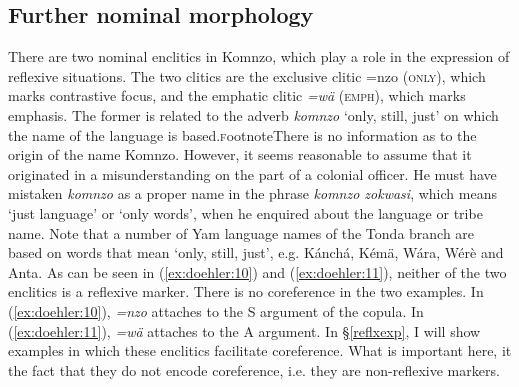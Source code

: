 \documentclass[output=paper]{langscibook}
\begin{document}
\begin{table}
        \caption{\label{perspron} Free pronouns}

\end{table}
\subsection{Further nominal morphology}\label{enclitics}
There are two nominal enclitics in Komnzo, which play a role in the expression of reflexive situations. The two clitics are the exclusive clitic {=nzo} (\textsc{only}), which marks contrastive focus, and the emphatic clitic \emph{=wä} (\textsc{emph}), which marks emphasis. The former is related to the adverb \emph{komnzo} `only, still, just' on which the name of the language is based.\textsc{f}ootnote{There is no information as to the origin of the name Komnzo. However, it seems reasonable to assume that it originated in a misunderstanding on the part of a colonial officer. He must have mistaken \emph{komnzo} as a proper name in the phrase \emph{komnzo zokwasi}, which means `just language' or `only words', when he enquired about the language or tribe name. Note that a number of Yam language names of the Tonda branch are based on words that mean `only, still, just', e.g. Kánchá, Kémä, Wára, Wérè and Anta.} As can be seen in (\ref{ex:doehler:10}) and (\ref{ex:doehler:11}), neither of the two enclitics is a reflexive marker. There is no coreference in the two examples. In (\ref{ex:doehler:10}), \emph{=nzo} attaches to the S argument of the copula. In (\ref{ex:doehler:11}), \emph{=wä} attaches to the A argument. In \S\ref{reflxexp}, I will show examples in which these enclitics facilitate coreference. What is important here, it the fact that they do not encode coreference, i.e. they are non-reflexive markers.
\end{document}
